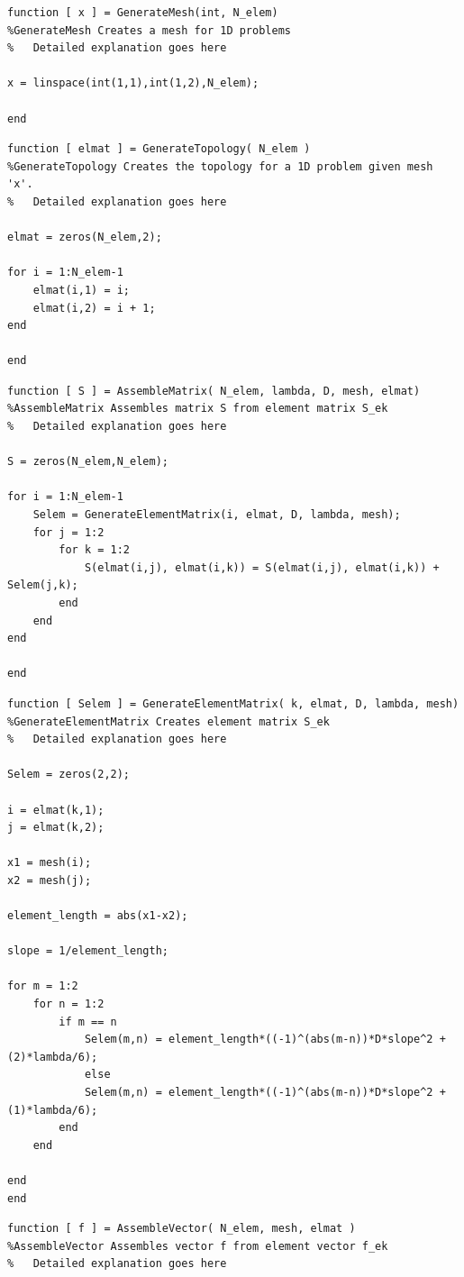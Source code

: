 \documentclass[a4paper]{report}
\begin{document}
\begin{appendices}
\begin{lstlisting}
function [ x ] = GenerateMesh(int, N_elem)
%GenerateMesh Creates a mesh for 1D problems
%   Detailed explanation goes here

x = linspace(int(1,1),int(1,2),N_elem);

end
\end{lstlisting}

\begin{lstlisting}
function [ elmat ] = GenerateTopology( N_elem )
%GenerateTopology Creates the topology for a 1D problem given mesh 'x'.
%   Detailed explanation goes here

elmat = zeros(N_elem,2);

for i = 1:N_elem-1
	elmat(i,1) = i;
	elmat(i,2) = i + 1;
end

end

\end{lstlisting}

\begin{lstlisting}
function [ S ] = AssembleMatrix( N_elem, lambda, D, mesh, elmat)
%AssembleMatrix Assembles matrix S from element matrix S_ek
%   Detailed explanation goes here

S = zeros(N_elem,N_elem);

for i = 1:N_elem-1
	Selem = GenerateElementMatrix(i, elmat, D, lambda, mesh);
	for j = 1:2
		for k = 1:2
			S(elmat(i,j), elmat(i,k)) = S(elmat(i,j), elmat(i,k)) + Selem(j,k);
		end
	end
end

end
\end{lstlisting}
\newpage
\begin{lstlisting}
function [ Selem ] = GenerateElementMatrix( k, elmat, D, lambda, mesh)
%GenerateElementMatrix Creates element matrix S_ek
%   Detailed explanation goes here

Selem = zeros(2,2);

i = elmat(k,1);
j = elmat(k,2);

x1 = mesh(i);
x2 = mesh(j);

element_length = abs(x1-x2);

slope = 1/element_length; 

for m = 1:2
	for n = 1:2
		if m == n
			Selem(m,n) = element_length*((-1)^(abs(m-n))*D*slope^2 + (2)*lambda/6);
			else
			Selem(m,n) = element_length*((-1)^(abs(m-n))*D*slope^2 + (1)*lambda/6);
		end
	end

end
end
\end{lstlisting}


\begin{lstlisting}
function [ f ] = AssembleVector( N_elem, mesh, elmat )
%AssembleVector Assembles vector f from element vector f_ek
%   Detailed explanation goes here


\end{lstlisting}
\end{appendices}
\end{document}
